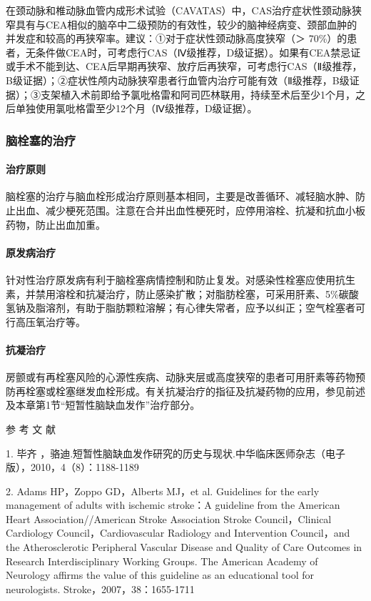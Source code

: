 在颈动脉和椎动脉血管内成形术试验（CAVATAS）中，CAS治疗症状性颈动脉狭窄具有与CEA相似的脑卒中二级预防的有效性，较少的脑神经病变、颈部血肿的并发症和较高的再狭窄率。建议：①对于症状性颈动脉高度狭窄（＞
70\%）的患者，无条件做CEA时，可考虑行CAS（Ⅳ级推荐，D级证据）。如果有CEA禁忌证或手术不能到达、CEA后早期再狭窄、放疗后再狭窄，可考虑行CAS（Ⅱ级推荐，B级证据）；②症状性颅内动脉狭窄患者行血管内治疗可能有效（Ⅱ级推荐，B级证据）；③支架植入术前即给予氯吡格雷和阿司匹林联用，持续至术后至少1个月，之后单独使用氯吡格雷至少12个月（Ⅳ级推荐，D级证据）。

\subsubsection{脑栓塞的治疗}

\paragraph{治疗原则}

脑栓塞的治疗与脑血栓形成治疗原则基本相同，主要是改善循环、减轻脑水肿、防止出血、减少梗死范围。注意在合并出血性梗死时，应停用溶栓、抗凝和抗血小板药物，防止出血加重。

\paragraph{原发病治疗}

针对性治疗原发病有利于脑栓塞病情控制和防止复发。对感染性栓塞应使用抗生素，并禁用溶栓和抗凝治疗，防止感染扩散；对脂肪栓塞，可采用肝素、5\%碳酸氢钠及脂溶剂，有助于脂肪颗粒溶解；有心律失常者，应予以纠正；空气栓塞者可行高压氧治疗等。

\paragraph{抗凝治疗}

房颤或有再栓塞风险的心源性疾病、动脉夹层或高度狭窄的患者可用肝素等药物预防再栓塞或栓塞继发血栓形成。有关抗凝治疗的指征及抗凝药物的应用，参见前述及本章第1节“短暂性脑缺血发作”治疗部分。

\hypertarget{text00242.htmlux5cux23CHP8-1-2-4}{}
参 考 文 献

1. 毕齐
，骆迪.短暂性脑缺血发作研究的历史与现状.中华临床医师杂志（电子版），2010，4（8）：1188-1189

2. Adams HP，Zoppo GD，Alberts MJ，et al. Guidelines for the early
management of adults with ischemic stroke：A guideline from the American
Heart Association//American Stroke Association Stroke Council，Clinical
Cardiology Council，Cardiovascular Radiology and Intervention
Council，and the Atherosclerotic Peripheral Vascular Disease and Quality
of Care Outcomes in Research Interdisciplinary Working Groups. The
American Academy of Neurology affirms the value of this guideline as an
educational tool for neurologists. Stroke，2007，38：1655-1711

